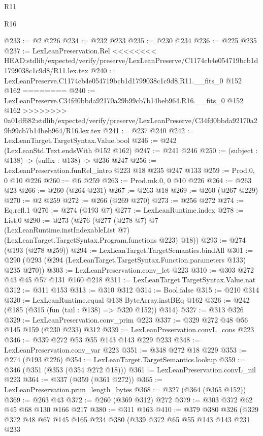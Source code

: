\begin{lexlean}{R11}
\begin{lexlean}{R16}
\begin{coremodule}
{{{{{@233 := @2 @226
@234 := @232 @233
@235 := @230 @234
@236 := @225 @235
@237 := LexLeanPreservation.Rel
<<<<<<<< HEAD:stdlib/expected/verify/preserve/LexLeanPreserve/C1174cb4e054719bcb1d1799038c1c9d8/R11.lex.tex
@240 := LexLeanPreserve.C1174cb4e054719bcb1d1799038c1c9d8.R11.__fits_0 @152 @162
========
@240 := LexLeanPreserve.C34fd0bbda92170a29b99cb7b14beb964.R16.__fits_0 @152 @162
>>>>>>>> 0a01df682:stdlib/expected/verify/preserve/LexLeanPreserve/C34fd0bbda92170a29b99cb7b14beb964/R16.lex.tex
@241 := @237 @240
@242 := LexLeanTarget.TargetSyntax.Value.bool
@246 := @242 (LexLeanStd.Text.endsWith @152 @162)
@247 := @241 @246
@250 := (subject : @138) -> (suffix : @138) -> @236 @247
@256 := LexLeanPreservation.funRel_intro @223 @18 @235 @247 @133
@259 := Prod.{0, 0} @10 @226
@260 := @6 @259
@263 := Prod.mk.{0, 0} @10 @226
@264 := @263 @23
@266 := @260 (@264 @231)
@267 := @263 @18
@269 := @260 (@267 @229)
@270 := @2 @259
@272 := @266 (@269 @270)
@273 := @256 @272
@274 := Eq.refl.{1}
@276 := @274 (@193 @7)
@277 := LexLeanRuntime.index
@278 := List.{0}
@290 := @273
    (@276
      (@277
        (@278 @7)
        @7
        (LexLeanRuntime.instIndexableList @7)
        (LexLeanTarget.TargetSyntax.Program.functions @223)
        @18))
@293 := @274 (@193 (@278 @259))
@294 := LexLeanTarget.TargetSemantics.bindAll
@301 := @290 (@293 (@294 (LexLeanTarget.TargetSyntax.Function.parameters @133) @235 @270))
@303 := LexLeanPreservation.conv_let @223
@310 := @303 @272 @43 @45 @57 @131 @160 @218
@311 := LexLeanTarget.TargetSyntax.Value.nat
@312 := @311 @153
@313 := @310 @312
@314 := Bool.false
@315 := @210 @314
@320 := LexLeanRuntime.equal @138 ByteArray.instBEq @162
@326 := @242 (@185 (@315 (fun (tail : @138) => @320 @152)) @314)
@327 := @313 @326
@329 := LexLeanPreservation.conv_prim @223
@337 := @329 @272 @48 @56 @145 @159 (@230 @233) @312
@339 := LexLeanPreservation.convL_cons @223
@346 := @339 @272 @53 @55 @143 @143 @229 @233
@348 := LexLeanPreservation.conv_var @223
@351 := @348 @272 @18 @229
@353 := @274 (@193 @226)
@354 := LexLeanTarget.TargetSemantics.lookup
@359 := @346 (@351 (@353 (@354 @272 @18)))
@361 := LexLeanPreservation.convL_nil @223
@364 := @337 (@359 (@361 @272))
@365 := LexLeanPreservation.prim_length_bytes
@368 := @327 (@364 (@365 @152))
@369 := @263 @43
@372 := @260 (@369 @312) @272
@379 := @303 @372 @62 @45 @68 @130 @166 @217
@380 := @311 @163
@410 := @379
    @380
    @326
    (@329
      @372
      @48
      @67
      @145
      @165
      @234
      @380
      (@339
        @372
        @65
        @55
        @143
        @143
        @231
        @233
}}}}}
\end{coremodule}
\end{lexlean}
\end{lexlean}
